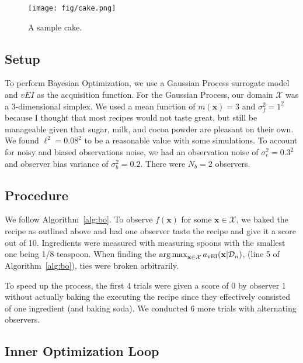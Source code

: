 \begin{figure}[h]
    \centering
    \texttt{[image: fig/cake.png]}
    \caption{A sample cake.}
    \label{fig:cake}
\end{figure}

\subsection{Setup}

To perform Bayesian Optimization, we use a Gaussian Process surrogate model and $vEI$ as the acquisition function.
For the Gaussian Process, our domain $\mathcal{X}$ was a 3-dimensional simplex.
We used a mean function of $m(\mathbf{x}) = 3$ and $\sigma^2_f = 1 ^ 2$ because I thought that most recipes would not taste great, but still be manageable given that sugar, milk, and cocoa powder are pleasant on their own.
We found $\ell^2 = 0.08^2$ to be a reasonable value with some simulations.
To account for noisy and biased observations noise, we had an observation noise of $\sigma^2_{\epsilon} = 0.3 ^ 2$ and observer bias variance of $\sigma_b^2 = 0.2$.
There were $N_b = 2$ observers.

\subsection{Procedure}

We follow Algorithm~\ref{alg:bo}.
To observe $f(\mathbf{x})$ for some $\mathbf{x} \in \mathcal{X}$, we baked the recipe as outlined above and had one observer taste the recipe and give it a score out of 10.
Ingredients were measured with measuring spoons with the smallest one being 1/8 teaspoon.
When finding the $\operatorname*{arg\,max}_{\mathbf{x} \in \mathcal{X} } a_{\mathrm{vEI}}( \mathbf{x} | \mathcal{D}_n)$, (line 5 of Algorithm~\ref{alg:bo}), ties were broken arbitrarily.

To speed up the process, the first 4 trials were given a score of 0 by observer 1 without actually baking the executing the recipe since they effectively consisted of one ingredient (and baking soda).
We conducted 6 more trials with alternating observers.

\subsection{Inner Optimization Loop}

